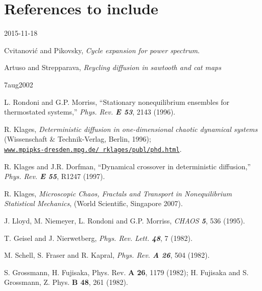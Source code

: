 \section{References to include}

{2015-11-18}

 Cvitanovi\'c and Pikovsky,
    {\em Cycle expansion for power spectrum}.

 Artuso and Strepparava,
    {\em Reycling diffusion in sawtooth and cat maps}


{ 7aug2002}


  L. Rondoni and G.P. Morriss,
	``Stationary nonequilibrium ensembles for thermostated systems,''
	{\em Phys. Rev. \bf E 53}, 2143 (1996).


 R. Klages,
	{\em Deterministic diffusion in one-dimensional chaotic
	dynamical systems} (Wissenschaft \& Technik-Verlag, Berlin, 1996);
    \\
	{\tt \href{http://www.mpipks-dresden.mpg.de/~rklages/publ/phd.html}
	          {www.mpipks-dresden.mpg.de/~rklages/publ/phd.html}}.

 R. Klages and J.R. Dorfman,
	``Dynamical crossover in deterministic diffusion,''
	{\em Phys. Rev. \bf E 55}, R1247 (1997). %


 R. Klages,
    {\em Microscopic Chaos, Fractals and Transport
     in Nonequilibrium Statistical Mechanics},
     (World Scientific, Singapore 2007).

  J. Lloyd, M. Niemeyer, L. Rondoni and G.P. Morriss,
	{\em CHAOS \bf  5}, 536 (1995).

 T. Geisel and J. Nierwetberg,
	{\em Phys. Rev. Lett. \bf 48}, 7 (1982).

 M. Schell, S. Fraser and R. Kapral,
	{\em Phys. Rev. \bf A 26}, 504 (1982).

 S. Grossmann, H. Fujisaka,
	{Phys. Rev. \bf A 26}, 1179 (1982);
	H. Fujisaka and S. Grossmann, {Z. Phys. \bf B 48}, 261 (1982).

